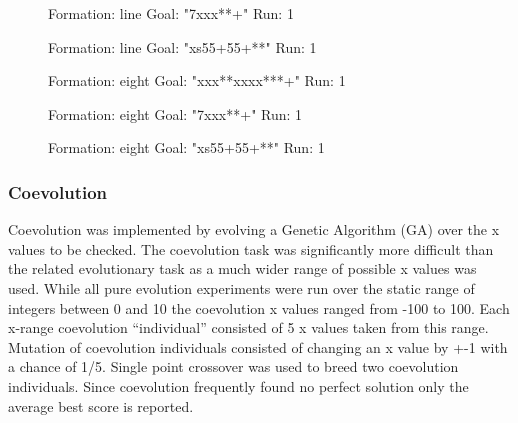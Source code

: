\documentclass[11pt]{article}
\begin{document}
\begin{itemize}
  \begin{figure}
  \centering
  \caption{Formation: line Goal: "7xxx**+" Run: 1}
  \end{figure}


  \begin{figure}
  \centering
  \caption{Formation: line Goal: "xs55+55+**" Run: 1}
  \end{figure}


  \begin{figure}
  \centering
  \caption{Formation: eight Goal: "xxx**xxxx***+" Run: 1}
  \end{figure}


  \begin{figure}
  \centering
  \caption{Formation: eight Goal: "7xxx**+" Run: 1}
  \end{figure}


  \begin{figure}
  \centering
  \caption{Formation: eight Goal: "xs55+55+**" Run: 1}
  \end{figure}


\end{itemize} %
\subsubsection*{Coevolution}
\label{sec-1.5.4}

Coevolution was implemented by evolving a Genetic Algorithm (GA) over
the x values to be checked.  The coevolution task was significantly
more difficult than the related evolutionary task as a much wider
range of possible x values was used.  While all pure evolution
experiments were run over the static range of integers between 0 and
10 the coevolution x values ranged from -100 to 100.  Each x-range
coevolution ``individual'' consisted of 5 x values taken from this
range.  Mutation of coevolution individuals consisted of changing an x
value by +-1 with a chance of 1/5.  Single point crossover was used to
breed two coevolution individuals.  Since coevolution frequently found
no perfect solution only the average best score is reported.
\end{document}
